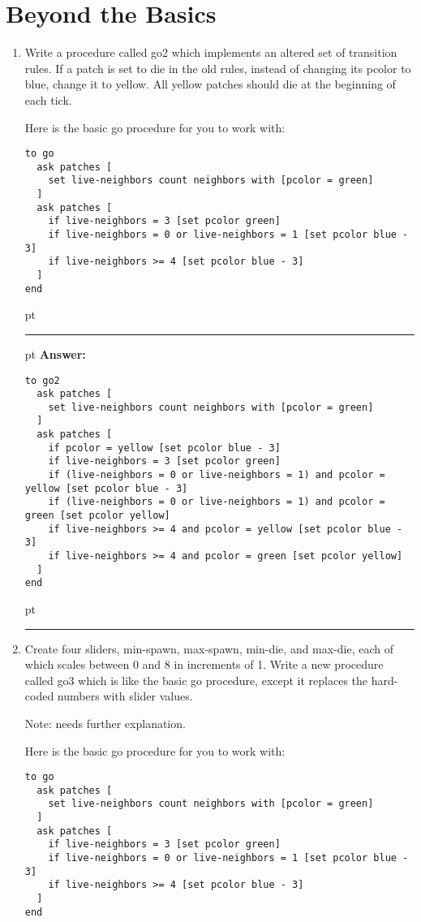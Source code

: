 \documentclass[11pt]{book}
\begin{document}
\section{Beyond the Basics}
\begin{enumerate}

\item Write a procedure called go2 which implements an altered set of transition rules. If a patch is set to die in the old rules, instead of changing its pcolor to blue, change it to yellow. All yellow patches should die at the beginning of each tick.

Here is the basic go procedure for you to work with:
\begin{verbatim}
to go
  ask patches [
    set live-neighbors count neighbors with [pcolor = green]
  ]
  ask patches [
    if live-neighbors = 3 [set pcolor green]
    if live-neighbors = 0 or live-neighbors = 1 [set pcolor blue - 3]
    if live-neighbors >= 4 [set pcolor blue - 3]
  ]
end
\end{verbatim}

\ifnum{}
 pt
\hrule
{} pt
{\bf Answer: }
\begin{verbatim}
to go2
  ask patches [
    set live-neighbors count neighbors with [pcolor = green]
  ]
  ask patches [
    if pcolor = yellow [set pcolor blue - 3]
    if live-neighbors = 3 [set pcolor green]
    if (live-neighbors = 0 or live-neighbors = 1) and pcolor = yellow [set pcolor blue - 3]
    if (live-neighbors = 0 or live-neighbors = 1) and pcolor = green [set pcolor yellow]
    if live-neighbors >= 4 and pcolor = yellow [set pcolor blue - 3]
    if live-neighbors >= 4 and pcolor = green [set pcolor yellow]
  ]
end
\end{verbatim}
 pt
\hrule
\fi

\item Create four sliders, min-spawn, max-spawn, min-die, and max-die, each of which scales between 0 and 8 in increments of 1. Write a new procedure called go3 which is like the basic go procedure, except it replaces the hard-coded numbers with slider values.

Note: needs further explanation.

Here is the basic go procedure for you to work with:
\begin{verbatim}
to go
  ask patches [
    set live-neighbors count neighbors with [pcolor = green]
  ]
  ask patches [
    if live-neighbors = 3 [set pcolor green]
    if live-neighbors = 0 or live-neighbors = 1 [set pcolor blue - 3]
    if live-neighbors >= 4 [set pcolor blue - 3]
  ]
end
\end{verbatim}


\end{enumerate}
\end{document}
